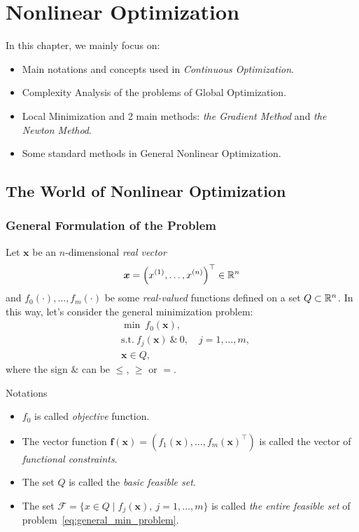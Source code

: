 \chapter{Nonlinear Optimization}\label{chap:nonlinear_optimization}

In this chapter, we mainly focus on:
\begin{itemize}
    \item Main notations and concepts used in \emph{Continuous Optimization}.
    \item Complexity Analysis of the problems of Global Optimization.
    \item Local Minimization and 2 main methods: \emph{the Gradient Method} and \emph{the Newton Method}.
    \item Some standard methods in General Nonlinear Optimization.
\end{itemize}

\newpage
\section{The World of Nonlinear Optimization}\label{sec:the_world_of_nonlinear_optimization}

\subsection{General Formulation of the Problem}\label{subsec:general_formulation_of_the_problem}
Let \(\bm{x}\) be an \(n\)-dimensional \emph{real vector}
\[
    \bm{x} = \left( x^{(1)}, \dots, x^{(n)} \right)^\top \in \mathbb{R}^n
\]
and \(f_0(\cdot), \dots, f_m(\cdot)\) be some \emph{real-valued} functions defined on a set \(Q \subset \mathbb{R}^n\). In this way, let's consider the general minimization problem:
\begin{equation}\label{eq:general_min_problem}
    \begin{aligned}
        &\min ~ f_0(\bm{x}), \\
        &\text{s.t.}~f_j(\bm{x}) ~ \& ~ 0, \quad j = 1, \dots, m,\\
        &\bm{x} \in Q,
    \end{aligned}
\end{equation}
where the sign \(\&\) can be \(\le\), \(\ge\) or \(=\).

\begin{note}{Notations}
    \begin{itemize}
        \item \(f_0\) is called \emph{objective} function.
        \item The vector function \(\bm{f}(\bm{x}) = \left( f_1(\bm{x}), \dots, f_m(\bm{x})^\top \right)\) is called the vector of \emph{functional constraints}.
        \item The set \(Q\) is called the \emph{basic feasible set}.
        \item The set \( \mathscr{F} = \{ x \in Q \mid f_j(\bm{x}), ~j=1, \dots, m \}\) is called \emph{the entire feasible set} of problem~\ref{eq:general_min_problem}. 
    \end{itemize}
\end{note}

